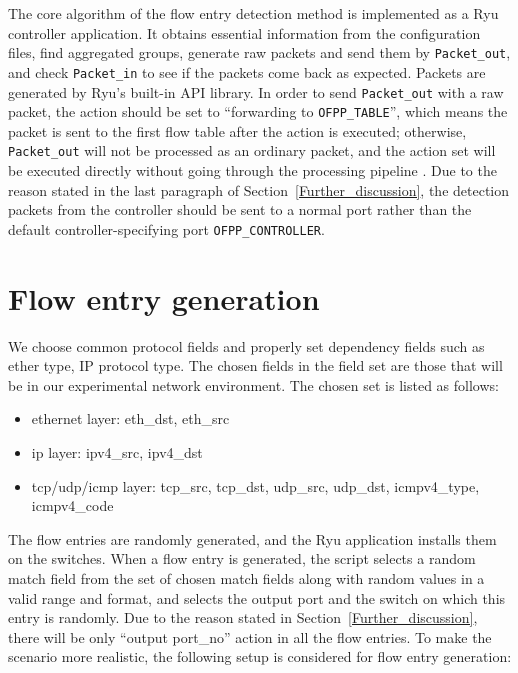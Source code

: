 The core algorithm of the flow entry detection method is implemented as a Ryu controller application. It obtains essential information from the configuration files, find aggregated groups, generate raw packets and send them by \texttt{Packet\_out}, and check \texttt{Packet\_in} to see if the packets come back as expected. Packets are generated by Ryu's built-in API library. In order to send \texttt{Packet\_out} with a raw packet, the action should be set to ``forwarding to \texttt{OFPP\_TABLE}'', which means the packet is sent to the first flow table after the action is executed; otherwise, \texttt{Packet\_out} will not be processed as an ordinary packet, and the action set will be executed directly without going through the processing pipeline \cite{PACKETOUT}. Due to the reason stated in the last paragraph of Section~\ref{Further_discussion}, the detection packets from the controller should be sent to a normal port rather than the default controller-specifying port \texttt{OFPP\_CONTROLLER}. 

\section{Flow entry generation}
We choose common protocol fields and properly set dependency fields such as ether type, IP protocol type. The chosen fields in the field set are those that will be in our experimental network environment. The chosen set is listed as follows:

\begin{itemize}
\item
ethernet layer: eth\_dst, eth\_src
\item
ip layer: ipv4\_src, ipv4\_dst
\item
tcp/udp/icmp layer: tcp\_src, tcp\_dst, udp\_src, udp\_dst, icmpv4\_type, icmpv4\_code
\end{itemize}

The flow entries are randomly generated, and the Ryu application installs them on the switches. When a flow entry is generated, the script selects a random match field from the set of chosen match fields along with random values in a valid range and format, and selects the output port and the switch on which this entry is randomly. Due to the reason stated in Section~\ref{Further_discussion}, there will be only ``output port\_no'' action in all the flow entries. To make the scenario more realistic, the following setup is considered for flow entry generation:

